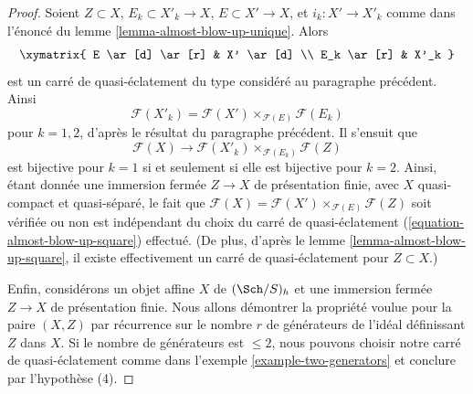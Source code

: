 \begin{proof}
\medskip\noindent
Soient $Z \subset X$, $E_k \subset X'_k \to X$, $E \subset X' \to X$, et
$i_k : X' \to X'_k$ comme dans l'énoncé du
lemme \ref{lemma-almost-blow-up-unique}. Alors
$$
\xymatrix{
E \ar[d] \ar[r] & X' \ar[d] \\
E_k \ar[r] & X'_k
}
$$
est un carré de quasi-éclatement du type considéré au paragraphe
précédent. Ainsi
$$
\mathcal{F}(X'_k) = \mathcal{F}(X') \times_{\mathcal{F}(E)} \mathcal{F}(E_k)
$$
pour $k = 1, 2$, d'après le résultat du paragraphe précédent. Il s'ensuit que
$$
\mathcal{F}(X) \longrightarrow
\mathcal{F}(X'_k) \times_{\mathcal{F}(E_k)} \mathcal{F}(Z)
$$
est bijective pour $k = 1$ si et seulement si elle est bijective pour $k = 2$.
Ainsi, étant donnée une immersion fermée $Z \to X$ de présentation finie,
avec $X$ quasi-compact et quasi-séparé, le fait que
$\mathcal{F}(X) = \mathcal{F}(X') \times_{\mathcal{F}(E)} \mathcal{F}(Z)$
soit vérifiée ou non est indépendant du choix du carré de quasi-éclatement
(\ref{equation-almost-blow-up-square}) effectué.
(De plus, d'après le lemme \ref{lemma-almost-blow-up-square},
il existe effectivement un carré de
quasi-éclatement pour $Z \subset X$.)

\medskip\noindent
Enfin, considérons un objet affine $X$ de $(\Sch/S)_h$
et une immersion fermée $Z \to X$ de présentation finie.
Nous allons démontrer la propriété voulue pour la paire $(X, Z)$
par récurrence sur le nombre $r$ de générateurs de l'idéal
définissant $Z$ dans $X$. Si le nombre de générateurs est $\leq 2$,
nous pouvons choisir notre carré de quasi-éclatement comme
dans l'exemple \ref{example-two-generators}
et conclure par l'hypothèse (4).


\end{proof}
